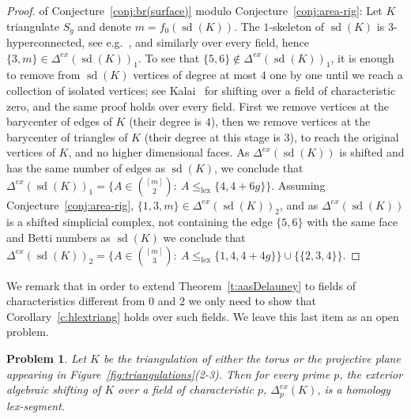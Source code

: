 \documentclass[11pt]{article}
\newtheorem{problem}[theorem]{Problem}
\numberwithin{claimcounter}{theorem}
\theoremstyle{remark}
\theoremstyle{definition}
\numberwithin{theorem}{section}
\DeclareMathOperator{\lex}{lex}
\DeclareMathOperator{\sd}{sd}
\newcommand{\exshift}[1]{\Delta^{ex}(#1)}
\begin{document}
\begin{proof} of Conjecture~\ref{conj:br(surface)} modulo 
Conjecture~\ref{conj:area-rig}: 
Let $K$ triangulate $S_g$ and denote $m=f_0(\sd(K))$.
The $1$-skeleton of $\sd(K)$ is $3$-hyperconnected, see e.g.~\cite[Thm.3.4.2]{nevo07-thesis}, and similarly over every field, hence $\{3,m\}\in \exshift{\sd(K)}_1$. To see that $\{5,6\}\notin \exshift{\sd(K)}_1$, it is enough to remove from $\sd(K)$ vertices of degree at most $4$ one by one until we reach a collection of isolated vertices; see Kalai~\cite[Lem.4.3(i)]{kalai85-hyperconnectivity} for shifting over a field of characteristic zero, and the same proof holds over every field. First we remove vertices at the barycenter of edges of $K$ (their degree is $4$), then we remove vertices at the barycenter of triangles of $K$ (their degree at this stage is $3$), to reach the original vertices of $K$, and no higher dimensional faces. As 
$\exshift{\sd(K)}$ is shifted and has the same number of edges as $\sd(K)$, we conclude that $\exshift{\sd(K)}_1=\{A\in \binom{[m]}{2}:\ A\le_{\lex} \{4,4+6g\} \}$.
Assuming Conjecture~\ref{conj:area-rig}, $\{1,3,m\}\in \exshift{\sd(K)}_2$, and as $\exshift{\sd(K)}$ is a shifted simplicial complex, not containing the edge $\{5,6\}$ with the same face and Betti numbers as $\sd(K)$ we conclude that $\exshift{\sd(K)}_2=\{A\in \binom{[m]}{3}:\ A\le_{\lex} \{1,4,4+4g\}\}\cup\{\{2,3,4\}\}$.
\end{proof}
%
We remark that in order to extend Theorem~\ref{t:aasDelauney} to fields of characteristics different from $0$ and $2$ we only need to show that Corollary~\ref{c:hlextriang} holds over such fields. We leave this last item as an open problem.
\begin{problem}
    Let $K$ be the triangulation of either the torus or the projective plane appearing in Figure~\ref{fig:triangulations}(2-3). Then for every prime $p$, the exterior algebraic shifting of $K$ over a field of characteristic $p$, $\Delta^{ex}_p(K)$, is a homology lex-segment.
\end{problem}
%
%
\appendix
\end{document}
